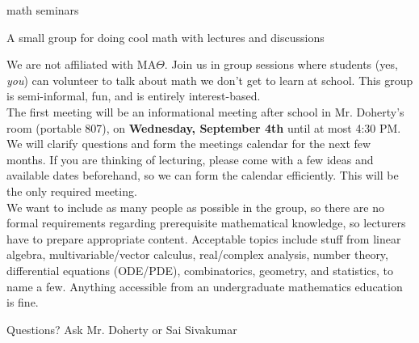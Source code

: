\documentclass[11pt]{article}
\begin{document}
\thispagestyle{empty}
\begin{center}
\Huge{}math seminars\\
\begin{figure}
\end{figure}
\Large{} A small group for doing cool math with lectures and discussions\\
\end{center}
We are not affiliated with MA$\Theta$. Join us in group sessions where students (yes, \textit{you}) can volunteer to talk about math we don't get to learn at school. This group is semi-informal, fun, and is entirely interest-based.\vspace{5pt}\\
The first meeting will be an informational meeting after school in Mr. Doherty's room (portable 807), on \textbf{Wednesday, September 4th} until at most 4:30 PM. We will clarify questions and form the meetings calendar for the next few months. If you are thinking of lecturing, please come with a few ideas and available dates beforehand, so we can form the calendar efficiently. This will be the only required meeting.\vspace{5pt}\\
We want to include as many people as possible in the group, so there are no formal requirements regarding prerequisite mathematical knowledge, so lecturers have to prepare appropriate content. Acceptable topics include stuff from linear algebra, multivariable/vector calculus, real/complex analysis, number theory, differential equations (ODE/PDE), combinatorics, geometry, and statistics, to name a few. Anything accessible from an undergraduate mathematics education is fine. 
\begin{flushright}
Questions? Ask Mr. Doherty or Sai Sivakumar
\end{flushright}
\end{document}

